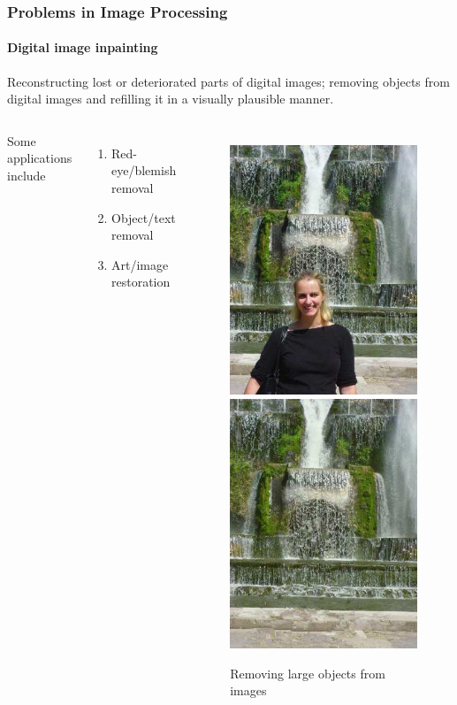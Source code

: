 \documentclass{beamer}
\begin{document}
\begin{frame}
\frametitle{Problems in Image Processing}
\framesubtitle{Digital image inpainting}

Reconstructing lost or deteriorated parts of digital images; removing objects from 
digital images and refilling it in a visually plausible manner.

\begin{columns}[c] %
Some applications include
\begin{enumerate}
	\item Red-eye/blemish removal
	\item Object/text removal
	\item Art/image restoration
\end{enumerate}
\begin{figure} %
\centering
	\includegraphics[width=0.45\columnwidth]{../figures/researchmicros-000.jpg}
	\hfill
	\includegraphics[width=0.45\columnwidth]{../figures/researchmicros-001.jpg}
\caption{Removing large objects from images}
\end{figure}
\end{columns}

\end{frame}
\end{document}
